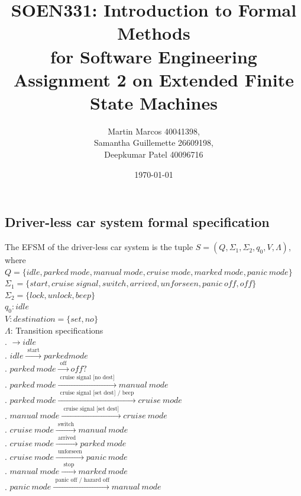 \documentclass[12pt]{article}
\title{SOEN331: Introduction to Formal Methods\\for Software Engineering\\
Assignment 2 on Extended Finite State Machines}
\author{Martin Marcos 40041398,\\ Samantha Guillemette 26609198,\\ Deepkumar Patel 40096716  }
\date{\today}
\begin{document}
\begin{spacing}{1.5}

\maketitle

\section{Driver-less car system formal specification}

\noindent The EFSM of the driver-less car system is the tuple $S = (Q, \Sigma_1, \Sigma_2, q_0, V, \Lambda)$, where\\

\noindent $Q = \{idle, parked~mode, manual~mode, cruise~mode, marked~mode, panic~mode\}$\\
\noindent $\Sigma_1 = \{start, cruise~signal, switch, arrived, unforseen,panic~off, off\}$\\
\noindent $\Sigma_2 = \{lock, unlock, beep\}$\\
\noindent $q_0: idle$\\
\noindent $V: destination = \{set, no\}$\\
\noindent $\Lambda$: Transition specifications\\
. $\rightarrow idle$\\
. $idle \xrightarrow {\text { start }} parked mode$\\
. $parked~mode  \xrightarrow {\text { off }} off?$\\
. $parked~mode  \xrightarrow {\text { cruise signal [no dest] }} manual~mode$\\
. $parked~mode  \xrightarrow {\text { cruise signal [set dest] / beep }} cruise~mode$\\
. $manual~mode  \xrightarrow {\text { cruise signal [set dest] }} cruise~mode$\\
. $cruise~mode  \xrightarrow {\text { switch }} manual~mode$\\
. $cruise~mode  \xrightarrow {\text { arrived }} parked~mode$\\
. $cruise~mode  \xrightarrow {\text { unforseen }} panic~mode$\\
. $manual~mode  \xrightarrow {\text { stop }} marked~mode$\\
. $panic~mode  \xrightarrow {\text { panic off / hazard off}} manual~mode$\\



\end{spacing}
\end{document}
